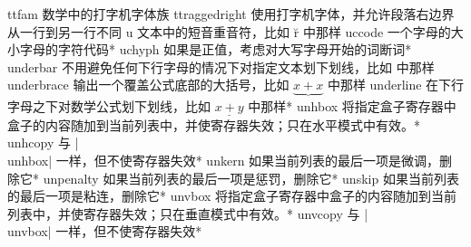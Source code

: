 \capcs ttfam {数学中的打字机字体族}{}{}
\capcs ttraggedright {使用打字机字体，并允许段落右边界从一行到另一行不同}{}{}
%
\capcs u {文本中的短音重音符，比如 \u r 中那样}{}{}
\capcs uccode {一个字母的大小字母的字符代码}*{}
\capcs uchyph {如果是正值，考虑对大写字母开始的词断词}*{}
\capcs underbar {不用避免任何下行字母的情况下对指定文本划下划线，比如  中那样}{}{}
\capcs underbrace {输出一个覆盖公式底部的大括号，比如 $\underbrace{x+x}{}$ 中那样}{}{}
\capcs underline {在下行字母之下对数学公式划下划线，比如 $\underline{x+y}$ 中那样}*{}
\capcs unhbox {将指定盒子寄存器中盒子的内容随加到当前列表中，并使寄存器失效；只在水平模式中有效。}*{}
\capcs unhcopy {与 |\\unhbox| 一样，但不使寄存器失效}*{}
\capcs unkern {如果当前列表的最后一项是微调，删除它}*{}
\capcs unpenalty {如果当前列表的最后一项是惩罚，删除它}*{}
\capcs unskip {如果当前列表的最后一项是粘连，删除它}*{}
\capcs unvbox {将指定盒子寄存器中盒子的内容随加到当前列表中，并使寄存器失效；只在垂直模式中有效。}*{}
\capcs unvcopy {与 |\\unvbox| 一样，但不使寄存器失效}*{}
